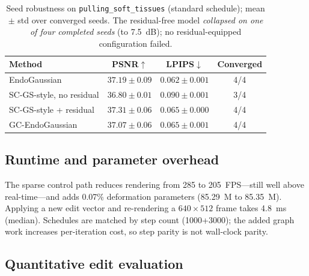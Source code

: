 \documentclass[AMA,Times1COL]{WileyNJDv5} %
\begin{document}
\begin{table}[t]%
\centering
\caption{Seed robustness on \texttt{pulling\_soft\_tissues} (standard schedule); mean $\pm$ std over converged seeds. The residual-free model \emph{collapsed on one of four completed seeds} (to 7.5~dB); no residual-equipped configuration failed.\protect\footnotemark\label{tab:seeds}}%
\begin{tabular*}{\columnwidth}{@{\extracolsep\fill}lccc@{\extracolsep\fill}}
\toprule
\textbf{Method} & \textbf{PSNR}$\uparrow$ & \textbf{LPIPS}$\downarrow$ & \textbf{Converged} \\
\midrule
EndoGaussian             & $37.19 \pm 0.09$ & $0.062 \pm 0.001$ & 4/4 \\
SC-GS-style, no residual & $36.80 \pm 0.01$ & $0.090 \pm 0.001$ & 3/4 \\
SC-GS-style + residual   & $37.31 \pm 0.06$ & $0.065 \pm 0.000$ & 4/4 \\
GC-EndoGaussian          & $37.07 \pm 0.06$ & $0.065 \pm 0.001$ & 4/4 \\
\bottomrule
\end{tabular*}
\end{table}

\subsection{Runtime and parameter overhead}

The sparse control path reduces rendering from 285 to 205~FPS---still well above real-time---and adds 0.07\% deformation parameters (85.29~M to 85.35~M). Applying a new edit vector and re-rendering a $640\times512$ frame takes 4.8~ms (median). Schedules are matched by step count (1000+3000); the added graph work increases per-iteration cost, so step parity is not wall-clock parity.

\subsection{Quantitative edit evaluation}\label{sec:edit_eval}
\end{document}
